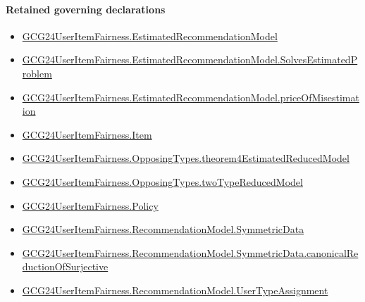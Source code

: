 \documentclass[10pt]{article}
\begin{document}
\paragraph{Retained governing declarations}
\begin{itemize}\raggedright
\item \hyperlink{governing-declaration-aee7fe9d79b0958e}{GCG24\allowbreak{}User\allowbreak{}Item\allowbreak{}Fairness.\allowbreak{}Estimated\allowbreak{}Recommendation\allowbreak{}Model}
\item \hyperlink{governing-declaration-1273b74e8e94e761}{GCG24\allowbreak{}User\allowbreak{}Item\allowbreak{}Fairness.\allowbreak{}Estimated\allowbreak{}Recommendation\allowbreak{}Model.\allowbreak{}Solves\allowbreak{}Estimated\allowbreak{}Problem}
\item \hyperlink{paper-prerequisite-081a4236b4933494}{GCG24\allowbreak{}User\allowbreak{}Item\allowbreak{}Fairness.\allowbreak{}Estimated\allowbreak{}Recommendation\allowbreak{}Model.\allowbreak{}price\allowbreak{}Of\allowbreak{}Misestimation}
\item \hyperlink{governing-declaration-a7c560a429c6e204}{GCG24\allowbreak{}User\allowbreak{}Item\allowbreak{}Fairness.\allowbreak{}Item}
\item \hyperlink{governing-declaration-4861612962fb5ac5}{GCG24\allowbreak{}User\allowbreak{}Item\allowbreak{}Fairness.\allowbreak{}Opposing\allowbreak{}Types.\allowbreak{}theorem4\allowbreak{}Estimated\allowbreak{}Reduced\allowbreak{}Model}
\item \hyperlink{governing-declaration-b87168913e966e7f}{GCG24\allowbreak{}User\allowbreak{}Item\allowbreak{}Fairness.\allowbreak{}Opposing\allowbreak{}Types.\allowbreak{}two\allowbreak{}Type\allowbreak{}Reduced\allowbreak{}Model}
\item \hyperlink{governing-declaration-34ca6b905b48428a}{GCG24\allowbreak{}User\allowbreak{}Item\allowbreak{}Fairness.\allowbreak{}Policy}
\item \hyperlink{governing-declaration-5bf2c3489c614d0a}{GCG24\allowbreak{}User\allowbreak{}Item\allowbreak{}Fairness.\allowbreak{}Recommendation\allowbreak{}Model.\allowbreak{}Symmetric\allowbreak{}Data}
\item \hyperlink{governing-declaration-74d9be2e84dd2134}{GCG24\allowbreak{}User\allowbreak{}Item\allowbreak{}Fairness.\allowbreak{}Recommendation\allowbreak{}Model.\allowbreak{}Symmetric\allowbreak{}Data.\allowbreak{}canonical\allowbreak{}Reduction\allowbreak{}Of\allowbreak{}Surjective}
\item \hyperlink{governing-declaration-ff90b1efab93f1aa}{GCG24\allowbreak{}User\allowbreak{}Item\allowbreak{}Fairness.\allowbreak{}Recommendation\allowbreak{}Model.\allowbreak{}User\allowbreak{}Type\allowbreak{}Assignment}

\end{itemize}
\end{document}
